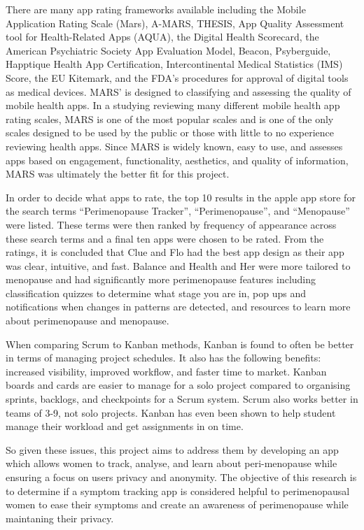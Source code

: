 There are many app rating frameworks available including the Mobile Application Rating Scale (Mars), A-MARS, THESIS, App Quality Assessment tool for Health-Related Apps (AQUA), the Digital Health Scorecard, the American Psychiatric Society App Evaluation Model, Beacon, Psyberguide, Happtique Health App Certification, Intercontinental Medical Statistics (IMS) Score, the EU Kitemark, and the FDA’s procedures for approval of digital tools as medical devices\cite{Morley2024}. MARS’ is designed to classifying and assessing the quality of mobile health apps\cite{Stoyanov2015}. In a studying reviewing many different mobile health app rating scales, MARS is one of the most popular scales and is one of the only scales designed to be used by the public or those with little to no experience reviewing health apps\cite{AzadKhaneghah2020}. Since MARS is widely known, easy to use, and assesses apps based on engagement, functionality, aesthetics, and quality of information, MARS was ultimately the better fit for this project.

In order to decide what apps to rate, the top 10 results in the apple app store for the search terms “Perimenopause Tracker”, “Perimenopause”, and “Menopause” were listed. These terms were then ranked by frequency of appearance across these search terms and a final ten apps were chosen to be rated. From the ratings, it is concluded that Clue and Flo had the best app design as their app was clear, intuitive, and fast. Balance and Health and Her were more tailored to menopause and had significantly more perimenopause features including classification quizzes to determine what stage you are in, pop ups and notifications when changes in patterns are detected, and resources to learn more about perimenopause and menopause. 

When comparing Scrum to Kanban methods, Kanban is found to often be better in terms of managing project schedules\cite{Lei2017}. It also has the following benefits: increased visibility,  improved workflow, and faster time to market\cite{Ahmad2018}. Kanban boards and cards are easier to manage for a solo project compared to organising sprints, backlogs, and checkpoints for a Scrum system. Scrum also works better in teams of 3-9, not solo projects\cite{Mundra2013Practical}. Kanban has even been shown to help student manage their workload and get assignments in on time\cite{Sheng2021Kanban}. 


So given these issues, this project aims to address them by developing an app which allows women to track, analyse, and learn about peri-menopause while ensuring a focus on users privacy and anonymity. The objective of this research is to determine if a symptom tracking app is considered helpful to perimenopausal women to ease their symptoms and create an awareness of perimenopause while maintaning their privacy. 

